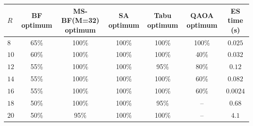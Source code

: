 \begin{longtable}{@{}lcccccc@{}}
\toprule
\(R\) & BF optimum & MS-BF(M=32) optimum & SA optimum & Tabu optimum & QAOA optimum & ES time (s) \\
\midrule
\endhead
\(8\) & 65\% & 100\% & 100\% & 100\% & 100\% & \(0.025\) \\
\(10\) & 60\% & 100\% & 100\% & 100\% & 40\% & \(0.032\) \\
\(12\) & 55\% & 100\% & 100\% & 95\% & 80\% & \(0.12\) \\
\(14\) & 55\% & 100\% & 100\% & 100\% & 60\% & \(0.082\) \\
\(16\) & 55\% & 100\% & 100\% & 100\% & 60\% & \(0.0024\) \\
\(18\) & 50\% & 100\% & 100\% & 95\% & -- & \(0.68\) \\
\(20\) & 50\% & 95\% & 100\% & 100\% & -- & \(4.1\) \\
\bottomrule
\end{longtable}
